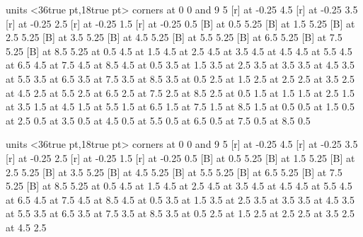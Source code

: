 \beginpicture
\setcoordinatesystem units <36true pt,18true pt>
\putrectangle corners at 0 0 and 9 5
 [r] at -0.25 4.5
 [r] at -0.25 3.5
 [r] at -0.25 2.5
 [r] at -0.25 1.5
 [r] at -0.25 0.5
 [B] at 0.5 5.25
 [B] at 1.5 5.25
 [B] at 2.5 5.25
 [B] at 3.5 5.25
 [B] at 4.5 5.25
 [B] at 5.5 5.25
 [B] at 6.5 5.25
 [B] at 7.5 5.25
 [B] at 8.5 5.25
 at 0.5 4.5
 at 1.5 4.5
 at 2.5 4.5
 at 3.5 4.5
 at 4.5 4.5
 at 5.5 4.5
 at 6.5 4.5
 at 7.5 4.5
 at 8.5 4.5
 at 0.5 3.5
 at 1.5 3.5
 at 2.5 3.5
 at 3.5 3.5
 at 4.5 3.5
 at 5.5 3.5
 at 6.5 3.5
 at 7.5 3.5
 at 8.5 3.5
 at 0.5 2.5
 at 1.5 2.5
 at 2.5 2.5
 at 3.5 2.5
 at 4.5 2.5
 at 5.5 2.5
 at 6.5 2.5
 at 7.5 2.5
 at 8.5 2.5
 at 0.5 1.5
 at 1.5 1.5
 at 2.5 1.5
 at 3.5 1.5
 at 4.5 1.5
 at 5.5 1.5
 at 6.5 1.5
 at 7.5 1.5
 at 8.5 1.5
 at 0.5 0.5
 at 1.5 0.5
 at 2.5 0.5
 at 3.5 0.5
 at 4.5 0.5
 at 5.5 0.5
 at 6.5 0.5
 at 7.5 0.5
 at 8.5 0.5
\endpicture
\bigskip

\beginpicture
\setcoordinatesystem units <36true pt,18true pt>
\putrectangle corners at 0 0 and 9 5
 [r] at -0.25 4.5
 [r] at -0.25 3.5
 [r] at -0.25 2.5
 [r] at -0.25 1.5
 [r] at -0.25 0.5
 [B] at 0.5 5.25
 [B] at 1.5 5.25
 [B] at 2.5 5.25
 [B] at 3.5 5.25
 [B] at 4.5 5.25
 [B] at 5.5 5.25
 [B] at 6.5 5.25
 [B] at 7.5 5.25
 [B] at 8.5 5.25
 at 0.5 4.5
 at 1.5 4.5
 at 2.5 4.5
 at 3.5 4.5
 at 4.5 4.5
 at 5.5 4.5
 at 6.5 4.5
 at 7.5 4.5
 at 8.5 4.5
 at 0.5 3.5
 at 1.5 3.5
 at 2.5 3.5
 at 3.5 3.5
 at 4.5 3.5
 at 5.5 3.5
 at 6.5 3.5
 at 7.5 3.5
 at 8.5 3.5
 at 0.5 2.5
 at 1.5 2.5
 at 2.5 2.5
 at 3.5 2.5
 at 4.5 2.5
